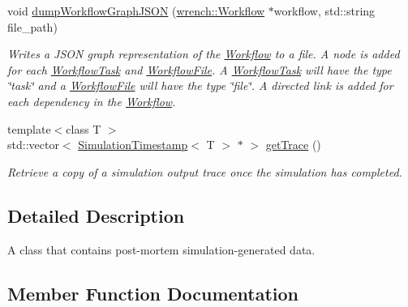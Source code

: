 \begin{DoxyCompactItemize}
void \hyperlink{classwrench_1_1_simulation_output_aeb5ce1ef8b84cda7b0df5f21532088b2}{dump\+Workflow\+Graph\+J\+S\+ON} (\hyperlink{classwrench_1_1_workflow}{wrench\+::\+Workflow} $\ast$workflow, std\+::string file\+\_\+path)
\begin{DoxyCompactList}\small\item\em Writes a J\+S\+ON graph representation of the \hyperlink{classwrench_1_1_workflow}{Workflow} to a file.  A node is added for each \hyperlink{classwrench_1_1_workflow_task}{Workflow\+Task} and \hyperlink{classwrench_1_1_workflow_file}{Workflow\+File}. A \hyperlink{classwrench_1_1_workflow_task}{Workflow\+Task} will have the type \char`\"{}task\char`\"{} and a \hyperlink{classwrench_1_1_workflow_file}{Workflow\+File} will have the type \char`\"{}file\char`\"{}. A directed link is added for each dependency in the \hyperlink{classwrench_1_1_workflow}{Workflow}. \end{DoxyCompactList}\item 
{\footnotesize template$<$class T $>$ }\\std\+::vector$<$ \hyperlink{classwrench_1_1_simulation_timestamp}{Simulation\+Timestamp}$<$ T $>$ $\ast$ $>$ \hyperlink{classwrench_1_1_simulation_output_a1d03324f34db985d0e181e42cf30cd9d}{get\+Trace} ()
\begin{DoxyCompactList}\small\item\em Retrieve a copy of a simulation output trace once the simulation has completed. \end{DoxyCompactList}\end{DoxyCompactItemize}


\subsection{Detailed Description}
A class that contains post-\/mortem simulation-\/generated data. 

\subsection{Member Function Documentation}
\mbox{\label{classwrench_1_1_simulation_output_a789834c9727ec0cd28faaf5176eaeecf}} 
